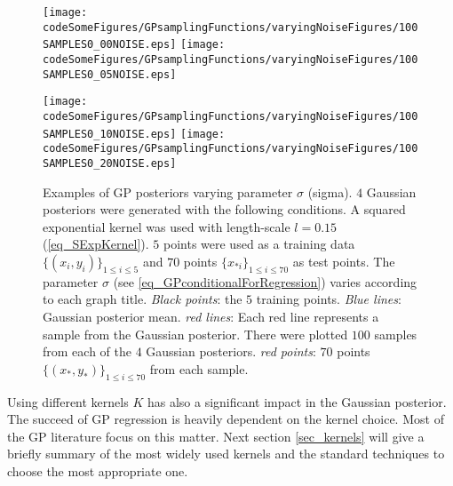 \begin{sidewaysfigure}[!htbp]  
  \centering
    \texttt{[image: codeSomeFigures/GPsamplingFunctions/varyingNoiseFigures/100SAMPLES0\_00NOISE.eps]}
    \texttt{[image: codeSomeFigures/GPsamplingFunctions/varyingNoiseFigures/100SAMPLES0\_05NOISE.eps]}
    \vspace{3mm}
     
    \texttt{[image: codeSomeFigures/GPsamplingFunctions/varyingNoiseFigures/100SAMPLES0\_10NOISE.eps]}
    \texttt{[image: codeSomeFigures/GPsamplingFunctions/varyingNoiseFigures/100SAMPLES0\_20NOISE.eps]}
  \caption[Examples of GP posteriors varying parameter $\sigma$]%
{Examples of GP posteriors varying parameter $\sigma$ (sigma). 
  $4$ Gaussian posteriors were generated with the following conditions. A squared exponential kernel was used with length-scale $l=0.15$ (\ref{eq_SExpKernel}). $5$ points were used as a training data $\{ (x_i,y_i) \}_{1 \leq i \leq 5}$ and $70$ points $\{x_{*i}\}_{1 \leq i \leq 70}$ as test points. The parameter $\sigma$ (see \ref{eq_GPconditionalForRegression}) varies according to each graph title.
  \emph{Black points}: the $5$ training points.
  \emph{Blue lines}: Gaussian posterior mean.
  \emph{red lines}: Each red line represents a sample from the Gaussian posterior. There were plotted $100$ samples from each of the $4$ Gaussian posteriors.
  \emph{red points}: $70$ points $\{(x_*,y_*)\}_{1 \leq i \leq 70}$ from each sample.
}
\label{fig_GPvaryingSigma}
\end{sidewaysfigure}

Using different kernels $K$ has also a significant impact in the Gaussian posterior. The succeed of GP regression is heavily dependent on the kernel choice. Most of the GP literature focus on this matter. Next section \ref{sec_kernels} will give a briefly summary of the most widely used kernels and the standard techniques to choose the most appropriate one.


